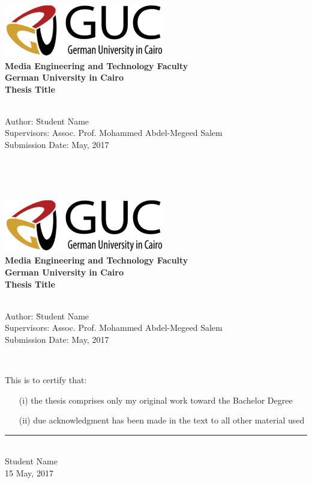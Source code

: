 \newcommand{\titlePage}{

\thispagestyle{empty}
\begin{center}
	\includegraphics[width=7cm]{gucLogo.jpg}\\
	\textbf{Media Engineering and Technology Faculty}\\[1mm]
	\textbf{German University in Cairo}\\[1mm]
	
	\vspace{2cm}
	\doublespacing
	{\Huge \textbf{Thesis Title}}\\
	\singlespacing
	\vspace{2cm}
	{\large \textbf{\typeOfThesis}}\\
	
	\vfill
	\parbox{1cm}{
  		\begin{large}
    			\begin{tabbing}
       			Author: \hspace{2cm}  
        			\=Student Name\\[2mm]
      			Supervisors: 
        			\>Assoc. Prof. Mohammed Abdel-Megeed Salem\\[2mm]
				
      			Submission Date: 
        			\>15 May, 2017\\
    			\end{tabbing}
  		\end{large}
	}\\
\end{center}
\clearpage
}
\titlePage
\thispagestyle{empty}\ \clearpage
\titlePage
\thispagestyle{empty}
This is to certify that:
\begin{itemize}
\item[(i)] the thesis comprises only my original work toward the Bachelor Degree
\item[(ii)] due acknowledgment has been made in the text to all other material used
\end{itemize}

\vspace{2cm}
\begin{flushright}
\rule[0mm]{6cm}{0.2mm}\\
Student Name\\
15 May, 2017\\
\end{flushright}
\clearpage
